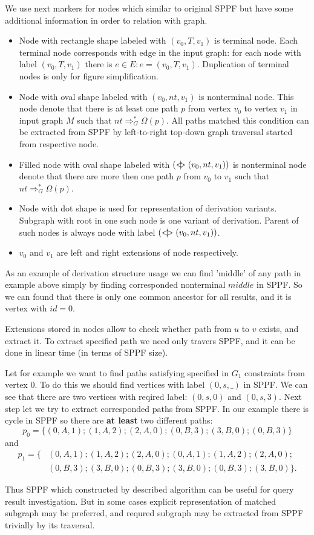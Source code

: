 We use next markers for nodes which similar to original SPPF but have some additional information in order to relation with graph.
\begin{itemize}
    \item Node with rectangle shape labeled with $(v_0, T, v_1)$ is terminal node. 
    Each terminal node corresponds with edge in the input graph: for each node with label $(v_0, T, v_1)$ there is $e\in E: e=(v_0,T,v_1)$.
    Duplication of terminal nodes is only for figure simplification.
    \item Node with oval shape labeled with $(v_0, nt, v_1)$ is nonterminal node. 
    This node denote that there is at least one path $p$ from vertex $v_0$ to vertex $v_1$ in input graph $M$ such that $nt \Rightarrow^*_G \Omega(p)$.
    All paths matched this condition can be extracted from SPPF by left-to-right top-down graph traversal started from respective node. 
    \item Filled node with oval shape labeled with $(<\mkern-11mu | \mkern-11mu> (v_0, nt, v_1))$ is nonterminal node denote that there are more then one path $p$ from $v_0$ to $v_1$ such that $nt \Rightarrow^*_G \Omega(p)$.
    \item Node with dot shape is used for representation of derivation variants.
    Subgraph with root in one such node is one variant of derivation.
    Parent of such nodes is always node with label $(<\mkern-9mu | \mkern-9mu> (v_0, nt, v_1))$.
    \item $v_0$ and $v_1$ are left and right extensions of node respectively.
\end{itemize}

As an example of derivation structure usage we can find 'middle' of any path in example above simply by finding corresponded nonterminal $middle$ in SPPF.
So we can found that there is only one common ancestor for all results, and it is vertex with $id = 0$. 

Extensions stored in nodes allow to check whether path from $u$ to $v$ exists, and extract it. 
To extract specified path we need only travers SPPF, and it can be done in linear time (in terms of SPPF size). 

Let for example we want to find paths satisfying specified in $G_1$ constraints from vertex $0$.
To do this we should find vertices with label $(0, s, \_)$ in SPPF.
We can see that there are two vertices with reqired label: $(0, s, 0)$ and $(0, s, 3)$.
Next step let we try to extract corresponded paths from SPPF.
In our example there is cycle in SPPF so there are \textbf{at least} two different paths: $$p_0=\{(0,A,1);(1,A,2);(2,A,0);(0,B,3);(3,B,0);(0,B,3)\}$$ and 
\begin{align*}
p_1=\{&(0,A,1);(1,A,2);(2,A,0);(0,A,1);(1,A,2);(2,A,0);\\ &(0,B,3);(3,B,0);(0,B,3);(3,B,0);(0,B,3);(3,B,0)\}.
\end{align*}


Thus SPPF which constructed by described algorithm can be useful for query result investigation. 
But in some cases explicit representation of matched subgraph may be preferred, and requred subgraph may be extracted from SPPF trivially by its traversal.
